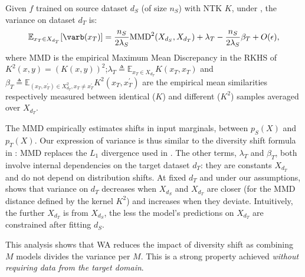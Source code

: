 \clearpage
\begin{proposition} \label{prop:var}%
    Given $f$ trained on source dataset $d_S$ (of size $n_S$) with NTK $K$, under , the variance on dataset $d_T$ is:%
    \begin{equation} \label{eq:int_var}%
        \mathbb{E}_{x_T\in X_{d_T}}[\varb(x_T)] = \frac{n_S}{2\lambda_S}\text{MMD}^{2}(X_{d_S}, X_{d_T}) + \lambda_T - \frac{n_S}{2\lambda_S}\beta_T + O(\epsilon),%
    \end{equation}%
    where $\text{MMD}$ is the empirical Maximum Mean Discrepancy in the RKHS of $K^2(x,y)=(K(x,y))^2$;$\lambda_T \triangleq \mathbb{E}_{x_T \in X_{d_T}} K\left(x_T, x_T\right)$ and $\beta_T \triangleq \mathbb{E}_{(x_T,x_T^\prime)\in X_{d_T}^2, x_T \neq x_T^\prime} K^2\left(x_T, x_T^{\prime}\right)$ are the empirical mean similarities respectively measured between identical (\wrt $K$) and different (\wrt $K^2$) samples averaged over $X_{d_T}$.%
\end{proposition}
The MMD empirically estimates shifts in input marginals, \ie between $p_S(X)$ and $p_T(X)$. Our expression of variance is thus similar to the diversity shift formula in \cite{ye2021odbench}: MMD replaces the $L_1$ divergence used in \cite{ye2021odbench}.
The other terms, $\lambda_T$ and $\beta_T$, both involve internal dependencies on the target dataset $d_T$: they are constants \wrt $X_{d_T}$ and do not depend on distribution shifts.
At fixed $d_T$ and under our assumptions,  shows that variance on $d_T$ decreases when $X_{d_S}$ and $X_{d_T}$ are closer (for the MMD distance defined by the kernel $K^2$) and increases when they deviate. Intuitively, the further $X_{d_T}$ is from $X_{d_S}$, the less the model's predictions on $X_{d_T}$ are constrained after fitting $d_S$.

This analysis shows that WA reduces the impact of diversity shift as combining $M$ models divides the variance per $M$. This is a strong property achieved \textit{without requiring data from the target domain}.